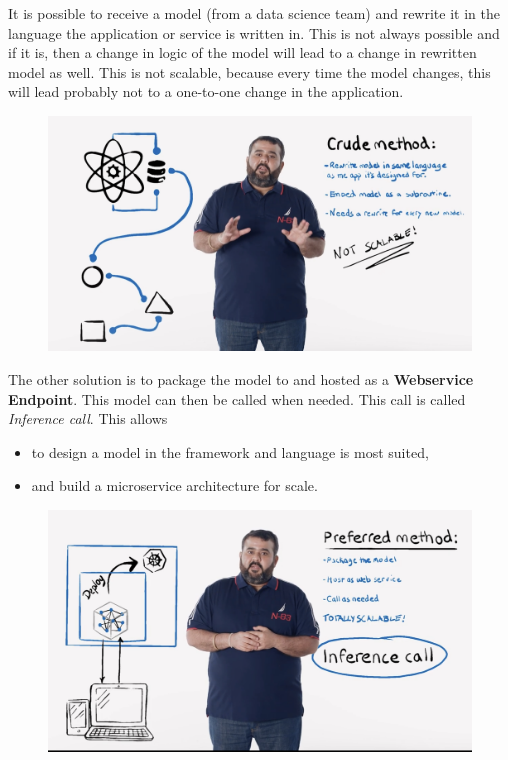 It is possible to receive a model (from a data science team) and rewrite it in the language the application or service is written in. This is not always possible and if it is, then a change in logic of the model will lead to a change in rewritten model as well. This is not scalable, because every time the model changes, this will lead probably not to a one-to-one change in the application.

\begin{figure}[H]
	\centering
	\includegraphics[scale = 0.1]{attachment/chapter_10/Scc009}
\end{figure}

The other solution is to package the model to and hosted as a \textbf{Webservice Endpoint}. This model can then be called when needed. This call is called \textit{Inference call}. This allows
\begin{itemize}
	\item to design a model in the framework and language is most suited, 
	\item and build a microservice architecture for scale. 
\end{itemize}


\begin{figure}[H]
	\centering
	\includegraphics[scale = 0.1]{attachment/chapter_10/Scc010}
\end{figure}





